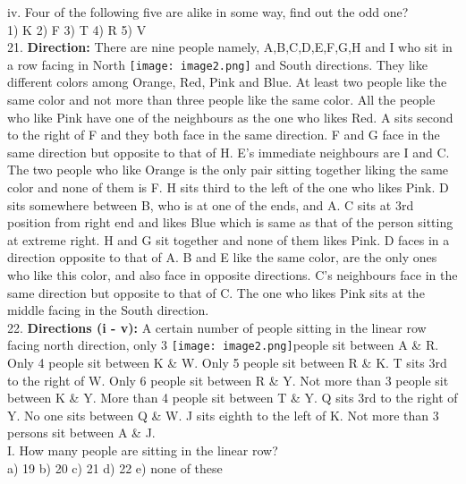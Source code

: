 \documentclass[
]{article}
\begin{document}
iv. Four of the following five are alike in some way, find out the odd one?\\
1) K \hspace{2mm}2) F \hspace{2mm}3) T \hspace{2mm}4) R \hspace{2mm}5) V\\

21. \textbf{Direction:}
There are nine people namely, A,B,C,D,E,F,G,H and I who sit in a row facing in
North \texttt{[image: image2.png]} and South directions. They like different colors among Orange, Red, Pink and Blue.
At least two people like the same color and not more than three people like the same color.
All the people who like Pink have one of the neighbours as the one who likes Red. A sits
second to the right of F and they both face in the same direction. F and G face in the same
direction but opposite to that of H. E’s immediate neighbours are I and C. The two people
who like Orange is the only pair sitting together liking the same color and none of them is F.
H sits third to the left of the one who likes Pink. D sits somewhere between B, who is at one
of the ends, and A. C sits at 3rd position from right end and likes Blue which is same as that
of the person sitting at extreme right. H and G sit together and none of them likes Pink. D
faces in a direction opposite to that of A. B and E like the same color, are the only ones who
like this color, and also face in opposite directions. C’s neighbours face in the same direction
but opposite to that of C. The one who likes Pink sits at the middle facing in the South
direction.\\

22. \textbf{Directions (i - v):} A certain number of people sitting in the linear row facing north direction,
only 3 \texttt{[image: image2.png]}people sit between A \& R. Only 4 people sit between K \& W. Only 5 people sit
between R \& K. T sits 3rd to the right of W. Only 6 people sit between R \& Y. Not more than
3 people sit between K \& Y. More than 4 people sit between T \& Y. Q sits 3rd to the right of
Y. No one sits between Q \& W. J sits eighth to the left of K. Not more than 3 persons sit
between A \& J.\\

I. How many people are sitting in the linear row?\\
a) 19 \hspace{2mm}b) 20 \hspace{2mm}c) 21 \hspace{2mm}d) 22 \hspace{2mm}e) none of these\\
\end{document}
